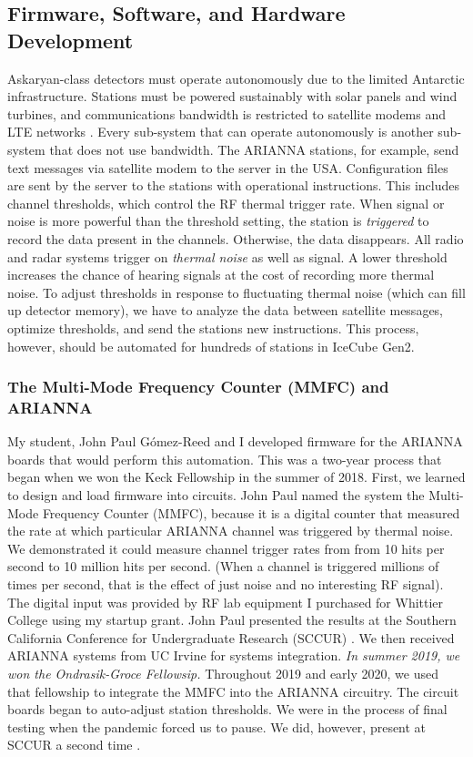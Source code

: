 \documentclass[../../../main.tex]{subfiles}
\begin{document}
\subsection{Firmware, Software, and Hardware Development}

Askaryan-class detectors must operate autonomously due to the limited Antarctic infrastructure.  Stations must be powered sustainably with solar panels and wind turbines, and communications bandwidth is restricted to satellite modems and LTE networks \cite{10.1109/tns.2015.2468182} \cite{Aguilar_2021}.  Every sub-system that can operate autonomously is another sub-system that does not use bandwidth.  The ARIANNA stations, for example, send text messages via satellite modem to the server in the USA.  Configuration files are sent by the server to the stations with operational instructions.  This includes channel thresholds, which control the RF thermal trigger rate.  When signal or noise is more powerful than the threshold setting, the station is \textit{triggered} to record the data present in the channels.  Otherwise, the data disappears.  All radio and radar systems trigger on \textit{thermal noise} as well as signal.  A lower threshold increases the chance of hearing signals at the cost of recording more thermal noise.  To adjust thresholds in response to fluctuating thermal noise (which can fill up detector memory), we have to analyze the data between satellite messages, optimize thresholds, and send the stations new instructions.  This process, however, should be automated for hundreds of stations in IceCube Gen2.

\subsubsection{The Multi-Mode Frequency Counter (MMFC) and ARIANNA}

My student, John Paul G\'{o}mez-Reed and I developed firmware for the ARIANNA boards that would perform this automation.  This was a two-year process that began when we won the Keck Fellowship in the summer of 2018. First, we learned to design and load firmware into circuits.  John Paul named the system the Multi-Mode Frequency Counter (MMFC), because it is a digital counter that measured the rate at which particular ARIANNA channel was triggered by thermal noise.  We demonstrated it could measure channel trigger rates from from 10 hits per second to 10 million hits per second.  (When a channel is triggered millions of times per second, that is the effect of just noise and no interesting RF signal).  The digital input was provided by RF lab equipment I purchased for Whittier College using my startup grant. John Paul presented the results at the Southern California Conference for Undergraduate Research (SCCUR) \cite{sccur1}.  We then received ARIANNA systems from UC Irvine for systems integration.  \textit{In summer 2019, we won the Ondrasik-Groce Fellowsip.}  Throughout 2019 and early 2020, we used that fellowship to integrate the MMFC into the ARIANNA circuitry.  The circuit boards began to auto-adjust station thresholds.  We were in the process of final testing when the pandemic forced us to pause.  We did, however, present at SCCUR a second time \cite{sccur2}.
\end{document}
